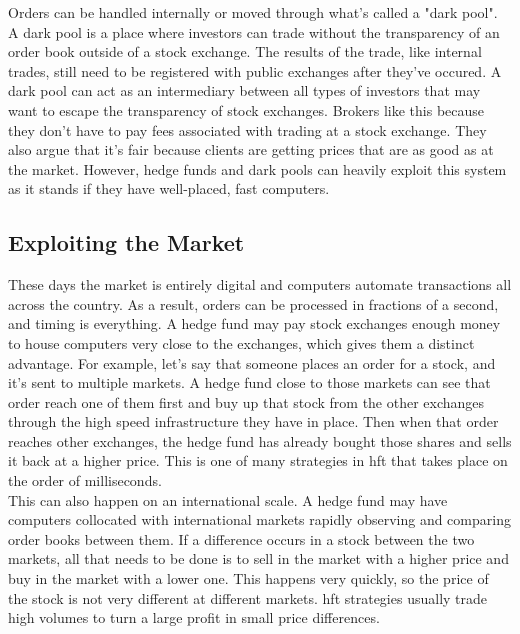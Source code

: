 Orders can be handled internally or moved through what's called a "dark pool". A dark pool is a place where investors can trade without the transparency of an order book outside of a stock exchange. The results of the trade, like internal trades, still need to be registered with public exchanges after they've occured. A dark pool can act as an intermediary between all types of investors that may want to escape the transparency of stock exchanges. Brokers like this because they don't have to pay fees associated with trading at a stock exchange. They also argue that it's fair because clients are getting prices that are as good as at the market. However, hedge funds and dark pools can heavily exploit this system as it stands if they have well-placed, fast computers. \\

\subsection{Exploiting the Market}
These days the market is entirely digital and computers automate transactions all across the country. As a result, orders can be processed in fractions of a second, and timing is everything. A hedge fund may pay stock exchanges enough money to house computers very close to the exchanges, which gives them a distinct advantage. For example, let's say that someone places an order for a stock, and it's sent to multiple markets. A hedge fund close to those markets can see that order reach one of them first and buy up that stock from the other exchanges through the high speed infrastructure they have in place. Then when that order reaches other exchanges, the hedge fund has already bought those shares and sells it back at a higher price. This is one of many strategies in \ac{hft} that takes place on the order of milliseconds. \\

This can also happen on an international scale. A hedge fund may have computers collocated with international markets rapidly observing and comparing order books between them. If a difference occurs in a stock between the two markets, all that needs to be done is to sell in the market with a higher price and buy in the market with a lower one. This happens very quickly, so the price of the stock is not very different at different markets. \ac{hft} strategies usually trade high volumes to turn a large profit in small price differences. \\


